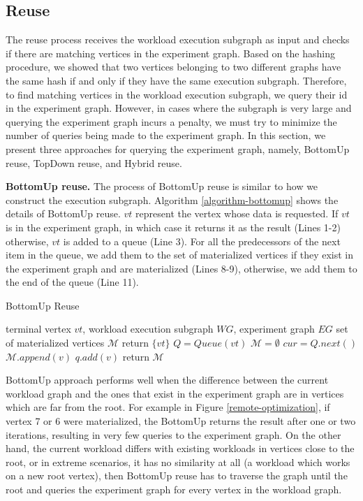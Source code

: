 \subsection{Reuse}
The reuse process receives the workload execution subgraph as input and checks if there are matching vertices in the experiment graph.
Based on the hashing procedure, we showed that two vertices belonging to two different graphs have the same hash if and only if they have the same execution subgraph.
Therefore, to find matching vertices in the workload execution subgraph, we query their id in the experiment graph.
However, in cases where the subgraph is very large and querying the experiment graph incurs a penalty, we must try to minimize the number of queries being made to the experiment graph.
In this section, we present three approaches for querying the experiment graph, namely, BottomUp reuse, TopDown reuse, and Hybrid reuse.

\textbf{BottomUp reuse.}
The process of BottomUp reuse is similar to how we construct the execution subgraph.
Algorithm \ref{algorithm-bottomup} shows the details of BottomUp reuse.
$vt$ represent the vertex whose data is requested.
If $vt$ is in the experiment graph, in which case it returns it as the result (Lines 1-2) otherwise, $vt$ is added to a queue (Line 3).
For all the predecessors of the next item in the queue, we add them to the set of materialized vertices if they exist in the experiment graph and are materialized (Lines 8-9), otherwise, we add them to the end of the queue (Line 11).
\begin{algorithm}[h]
\caption{BottomUp Reuse}\label{algorithm-bottomup}
\begin{algorithmic}[1]
\Require terminal vertex $vt$, workload execution subgraph  $WG$, experiment graph $EG$ 
\Ensure set of materialized vertices $\mathcal{M}$ 
	\State return $\{vt\}$
\EndIf
\State $Q = Queue(vt)$  
\State $\mathcal{M} = \emptyset$
	\State $cur = Q.next()$
			\State	$\mathcal{M}.append(v)$
		\Else 
			\State $q.add(v)$
		\EndIf
	\EndFor
\EndWhile
\State return $\mathcal{M}$
\end{algorithmic}
\end{algorithm}
BottomUp approach performs well when the difference between the current workload graph and the ones that exist in the experiment graph are in vertices which are far from the root.
For example in Figure \ref{remote-optimization}, if vertex 7 or 6 were materialized, the BottomUp returns the result after one or two iterations, resulting in very few queries to the experiment graph.
On the other hand, the current workload differs with existing workloads in vertices close to the root, or in extreme scenarios, it has no similarity at all (a workload which works on a new root vertex), then BottomUp reuse has to traverse the graph until the root and queries the experiment graph for every vertex in the workload graph.

